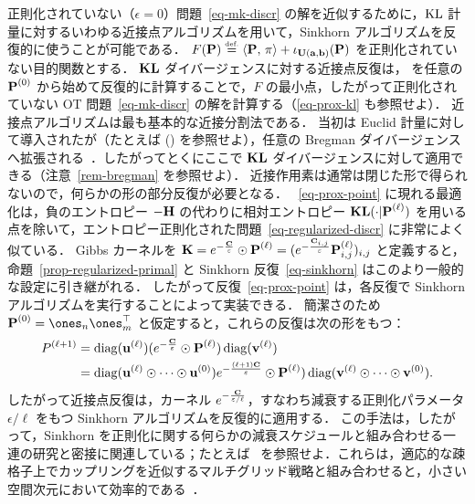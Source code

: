 \begin{rem}[近接点アルゴリズム]
正則化されていない（$\epsilon=0$）問題~\eqref{eq-mk-discr} の解を近似するために，$\operatorname{KL}$ 計量に対するいわゆる近接点アルゴリズムを用いて，Sinkhorn アルゴリズムを反復的に使うことが可能である．
%
$F(\mathrm{\textbf{P}}) \stackrel{\mbox{\upshape\tiny def.}}{=} \langle \mathrm{\textbf{P}},\,\pi\rangle + \iota_{\mathrm{\textbf{U}}(\mathrm{\textbf{a}},\mathrm{\textbf{b}})}(\mathrm{\textbf{P}})$ を正則化されていない目的関数とする．
%
$\mathrm{\textbf{KL}}$ ダイバージェンスに対する近接点反復は，
を任意の $\mathrm{\textbf{P}}^{(0)}$ から始めて反復的に計算することで，$F$ の最小点，したがって正則化されていない OT 問題~\eqref{eq-mk-discr} の解を計算する（\eqref{eq-prox-kl} も参照せよ）．
%
近接点アルゴリズムは最も基本的な近接分割法である．
%
当初は Euclid 計量に対して導入されたが（たとえば (\citealt{rockafellar1976monotone}) を参照せよ），任意の Bregman ダイバージェンスへ拡張される~\citep{censor1992proximal}．したがってとくにここで $\mathrm{\textbf{KL}}$ ダイバージェンスに対して適用できる（注意~\ref{rem-bregman} を参照せよ）．
%
近接作用素は通常は閉じた形で得られないので，何らかの形の部分反復が必要となる．
%
~\eqref{eq-prox-point} に現れる最適化は，負のエントロピー $-\mathrm{\textbf{H}}$ の代わりに相対エントロピー $\mathrm{\textbf{KL}}(\cdot|\mathrm{\textbf{P}}^{(\ell)})$ を用いる点を除いて，エントロピー正則化された問題~\eqref{eq-regularized-discr} に非常によく似ている．
%
Gibbs カーネルを $\mathrm{\textbf{K}}=e^{-\frac{\mathrm{\textbf{C}}}{\varepsilon}} \odot \mathrm{\textbf{P}}^{(\ell)} = ( e^{-\frac{\mathrm{\textbf{C}}_{i,j}}{\varepsilon}} \mathrm{\textbf{P}}^{(\ell)}_{i,j} )_{i,j}$ と定義すると，命題~\ref{prop-regularized-primal} と Sinkhorn 反復~\eqref{eq-sinkhorn} はこのより一般的な設定に引き継がれる．
%
したがって反復~\eqref{eq-prox-point} は，各反復で Sinkhorn アルゴリズムを実行することによって実装できる．
%
簡潔さのため $\init{\P}=\ones_n \ones_m^\top$ と仮定すると，これらの反復は次の形をもつ：
\begin{align*}
	P^{(\ell+1)} &=
		\operatorname{diag}(\mathrm{\textbf{u}}^{(\ell)}) ( e^{-\frac{\mathrm{\textbf{C}}}{\varepsilon}} \odot \mathrm{\textbf{P}}^{(\ell)} ) \operatorname{diag}(\mathrm{\textbf{v}}^{(\ell)})\\
		&=
		\operatorname{diag}(\mathrm{\textbf{u}}^{(\ell)} \odot \cdots \odot \mathrm{\textbf{u}}^{(0)})
			e^{-\frac{(\ell+1)\mathrm{\textbf{C}}}{\varepsilon}} \odot \mathrm{\textbf{P}}^{(\ell)} )
		\operatorname{diag}(\mathrm{\textbf{v}}^{(\ell)} \odot \cdots \odot \mathrm{\textbf{v}}^{(0)}).
\end{align*}
したがって近接点反復は，カーネル $e^{-\frac{\mathrm{\textbf{C}}}{\varepsilon/\ell}}$，すなわち減衰する正則化パラメータ $\epsilon/\ell$ をもつ Sinkhorn アルゴリズムを反復的に適用する．
%
この手法は，したがって，Sinkhorn を正則化に関する何らかの減衰スケジュールと組み合わせる一連の研究と密接に関連している；たとえば~\citep{kosowsky1994invisible} を参照せよ．これらは，適応的な疎格子上でカップリングを近似するマルチグリッド戦略と組み合わせると，小さい空間次元において効率的である~\citep{schmitzer2016stabilized}．
\end{rem}


